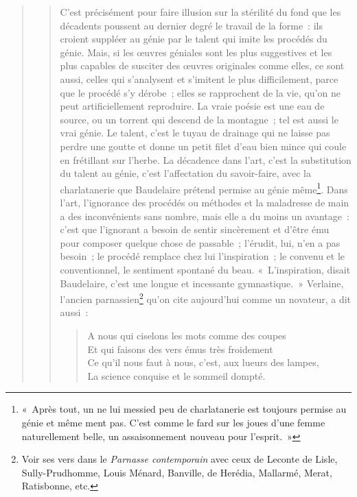 \documentclass[french,twoside]{book} %
\begin{document}
\begin{verse}
\begin{verse}
\noindent C’est précisément pour faire illusion sur la stérilité du fond que les décadents poussent au dernier degré le travail de la forme : ils croient suppléer au génie par le talent qui imite les procédés du génie. Mais, si les œuvres géniales sont les plus suggestives et les plus capables de susciter des œuvres originales comme elles, ce sont aussi, celles qui s’analysent et s’imitent le plus difficilement, parce que le procédé s’y dérobe ; elles se rapprochent de la vie, qu’on ne peut artificiellement reproduire. La vraie poésie est une eau de source, ou un torrent qui descend de la montagne ; tel est aussi le vrai génie. Le talent, c’est le tuyau de drainage qui ne laisse pas perdre une goutte et donne un petit filet d’eau bien mince qui coule en frétillant sur l’herbe. La décadence dans l’art, c’est la substitution du talent au génie, c’est l’affectation du savoir-faire, avec la charlatanerie que Baudelaire prétend permise au génie même\footnote{ « Après tout, un ne lui messied peu de charlatanerie est toujours permise au génie et même ment pas. C’est comme le fard sur les joues d’une femme naturellement belle, un assaisonnement nouveau pour l’esprit. »}. Dans l’art, l’ignorance des procédés ou méthodes et la maladresse de main a des inconvénients sans nombre, mais elle a du moins un avantage : c’est que l’ignorant a besoin de sentir sincèrement et d’être ému pour composer quelque chose de passable ; l’érudit, lui, n’en a pas besoin ; le procédé remplace chez lui l’inspiration ; le convenu et le conventionnel, le sentiment spontané du beau. « L’inspiration, disait Baudelaire, c’est une longue et incessante gymnastique. » Verlaine, l’ancien parnassien\footnote{ Voir ses vers dans le \emph{Parnasse contemporain} avec ceux de Leconte de Lisle, Sully-Prudhomme, Louis Ménard, Banville, de Herédia, Mallarmé, Merat, Ratisbonne, etc.} qu’on cite aujourd’hui comme un novateur, a dit aussi :\par


\begin{verse}
A nous qui ciselons les mots comme des coupes\\
Et qui faisons des vers émus très froidement\\
Ce qu’il nous faut à nous, c’est, aux lueurs des lampes,\\
La science conquise et le sommeil dompté.\\
\end{verse}


\end{verse}
\end{verse}
\end{document}

